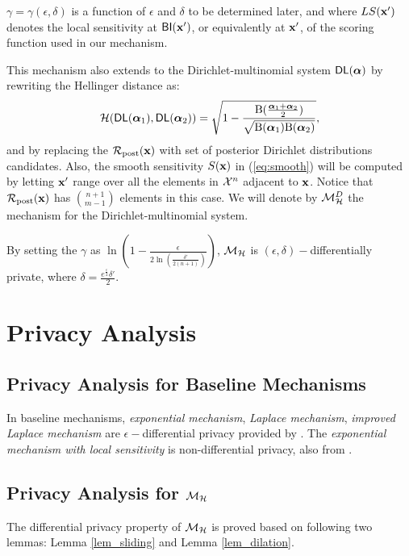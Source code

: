 \documentclass{article}
\begin{document}
$\gamma = \gamma(\epsilon, \delta)$ is a function of $\epsilon$ and $\delta$ to
be determined later, and where $LS(\textbf{x}')$ denotes the local
sensitivity at $\mathsf{BI}(\textbf{x}')$, or equivalently at $\textbf{x}'$,
of the scoring function used in our mechanism.

This mechanism also extends to the Dirichlet-multinomial system $\mathsf{DL}(\boldsymbol{\alpha})$ by rewriting the Hellinger distance as:
\[
  \mathcal{H}(\mathsf{DL}(\boldsymbol{\alpha}_1), \mathsf{DL}(\boldsymbol{\alpha}_2)) = \sqrt{1 - \frac{\textup{B}(\frac{\boldsymbol{\alpha}_1 + \boldsymbol{\alpha}_2}{2})}{\sqrt{\textup{B}(\boldsymbol{\alpha}_1) \textup{B}(\boldsymbol{\alpha}_2)}}},
\]
and by replacing the $\mathcal{R}_{\textup{post}}(\textbf{x})$ with set of posterior Dirichlet
distributions candidates. Also, the smooth sensitivity $S(\textbf{x})$
in (\ref{eq:smooth}) will be computed by letting $\textbf{x}'$ range
over all the elements in $\mathcal{X}^{n}$ adjacent to $\textbf{x}$. Notice
that $\mathcal{R}_{\textup{post}}(\textbf{x})$ has $\binom{n + 1}{m - 1}$ elements in this case. We
will denote by $\mathcal{M}^{D}_{\mathcal{H}}$ the mechanism for the
Dirichlet-multinomial system.

By setting the $\gamma$ as $\ln(1 - \frac{\epsilon}{2 \ln (\frac{\delta'}{2 (n + 1)})})$, $\mathcal{M}_{\mathcal{H}}$ is $(\epsilon, \delta) -$differentially private, where $\delta = \frac{e^{\frac{\epsilon}{2}} \delta'}{2}$.


\section{Privacy Analysis}

\subsection{Privacy Analysis for Baseline Mechanisms}
In baseline mechanisms, \emph{exponential mechanism}, \emph{Laplace mechanism}, \emph{improved Laplace mechanism} are $\epsilon-$differential privacy provided by \cite{dwork2014algorithmic}. The \emph{exponential mechanism with local sensitivity} is non-differential privacy, also from \cite{dwork2014algorithmic}.

\subsection{Privacy Analysis for $\mathcal{M}_{\mathcal{H}}$}

The differential privacy property of $\mathcal{M}_{\mathcal{H}}$ is proved based on following two lemmas: Lemma \ref{lem_sliding} and Lemma \ref{lem_dilation}.\\
\end{document}
